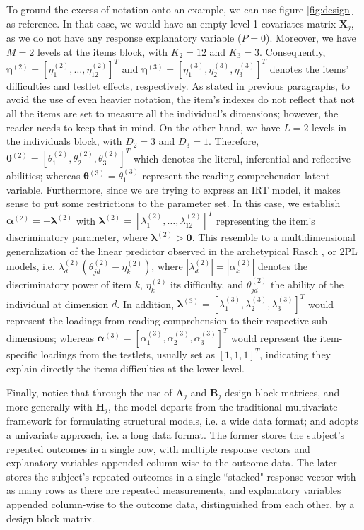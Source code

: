 To ground the excess of notation onto an example, we can use figure \ref{fig:design} as reference. In that case, we would have an empty level-1 covariates matrix $\mathbf{X}_{j}$, as we do not have any response explanatory variable ($P=0$). Moreover, we have $M=2$ levels at the items block, with $K_{2}=12$ and $K_{3}=3$. Consequently, $\pmb{\eta}^{(2)} = [ \eta_{1}^{(2)}, \dots, \eta_{12}^{(2)} ]^{T}$ and $\pmb{\eta}^{(3)} = [ \eta_{1}^{(3)}, \eta_{2}^{(3)}, \eta_{3}^{(3)} ]^{T}$ denotes the items' difficulties and testlet effects, respectively. As stated in previous paragraphs, to avoid the use of even heavier notation, the item's indexes do not reflect that not all the items are set to measure all the individual's dimensions; however, the reader needs to keep that in mind. On the other hand, we have $L=2$ levels in the individuals block, with $D_{2}=3$ and $D_{3}=1$. Therefore, $\pmb{\theta}^{(2)} = [ \theta_{1}^{(2)}, \theta_{2}^{(2)}, \theta_{3}^{(2)} ]^{T}$ which denotes the literal, inferential and reflective abilities; whereas $\pmb{\theta}^{(3)} = \theta_{1}^{(3)}$ represent the reading comprehension latent variable. Furthermore, since we are trying to express an IRT model, it makes sense to put some restrictions to the parameter set. In this case, we establish $\pmb{\alpha}^{(2)} = -\pmb{\lambda}^{(2)}$ with $ \pmb{\lambda}^{(2)} = [ \lambda_{1}^{(2)}, \dots, \lambda_{12}^{(2)} ]^{T}$ representing the item's discriminatory parameter, where $\pmb{\lambda}^{(2)} > \mathbf{0}$. This resemble to a multidimensional generalization of the linear predictor observed in the archetypical Rasch \cite{Rasch_1980}, or 2PL \cite{Lord_et_al_2008} models, i.e. $ \lambda^{(2)}_{d} (\theta^{(2)}_{jd} - \eta^{(2)}_{k} )$, where $| \lambda^{(2)}_{d} | = | \alpha^{(2)}_{k} |$ denotes the discriminatory power of item $k$, $\eta^{(2)}_{k}$ its difficulty, and $\theta^{(2)}_{jd}$ the ability of the individual at dimension $d$. In addition, $\pmb{\lambda}^{(3)} = [ \lambda_{1}^{(3)}, \lambda_{2}^{(3)}, \lambda_{3}^{(3)} ]^{T}$ would represent the loadings from reading comprehension to their respective sub-dimensions; whereas $\pmb{\alpha}^{(3)} = [ \alpha_{1}^{(3)}, \alpha_{2}^{(3)}, \alpha_{3}^{(3)} ]^{T}$ would represent the item-specific loadings from the testlets, usually set as $[1,1,1]^{T}$, indicating they explain directly the items difficulties at the lower level.

Finally, notice that through the use of $\mathbf{A}_{j}$ and $\mathbf{B}_{j}$ design block matrices, and more generally with $\mathbf{H}_{j}$, the model departs from the traditional multivariate framework for formulating structural models, i.e. a wide data format; and adopts a univariate approach, i.e. a long data format. The former stores the subject’s repeated outcomes in a single row, with multiple response vectors and explanatory variables appended column-wise to the outcome data. The later stores the subject’s repeated outcomes in a single ``stacked" response vector with as many rows as there are repeated measurements, and explanatory variables appended column-wise to the outcome data, distinguished from each other, by a design block matrix. 

